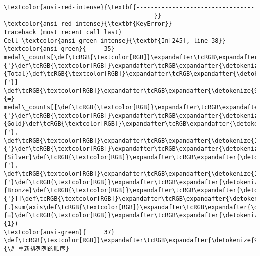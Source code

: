 \documentclass[11pt]{article}
\begin{document}
    \begin{Verbatim}[commandchars=\\\{\}, frame=single, framerule=2mm, rulecolor=\color{outerrorbackground}]
\textcolor{ansi-red-intense}{\textbf{---------------------------------------------------------------------------}}
\textcolor{ansi-red-intense}{\textbf{KeyError}}                                  Traceback (most recent call last)
Cell \textcolor{ansi-green-intense}{\textbf{In[245], line 38}}
\textcolor{ansi-green}{     35} medal\_counts[\def\tcRGB{\textcolor[RGB]}\expandafter\tcRGB\expandafter{\detokenize{175,0,0}}{'}\def\tcRGB{\textcolor[RGB]}\expandafter\tcRGB\expandafter{\detokenize{175,0,0}}{Total}\def\tcRGB{\textcolor[RGB]}\expandafter\tcRGB\expandafter{\detokenize{175,0,0}}{'}] \def\tcRGB{\textcolor[RGB]}\expandafter\tcRGB\expandafter{\detokenize{98,98,98}}{=} medal\_counts[[\def\tcRGB{\textcolor[RGB]}\expandafter\tcRGB\expandafter{\detokenize{175,0,0}}{'}\def\tcRGB{\textcolor[RGB]}\expandafter\tcRGB\expandafter{\detokenize{175,0,0}}{Gold}\def\tcRGB{\textcolor[RGB]}\expandafter\tcRGB\expandafter{\detokenize{175,0,0}}{'}, \def\tcRGB{\textcolor[RGB]}\expandafter\tcRGB\expandafter{\detokenize{175,0,0}}{'}\def\tcRGB{\textcolor[RGB]}\expandafter\tcRGB\expandafter{\detokenize{175,0,0}}{Silver}\def\tcRGB{\textcolor[RGB]}\expandafter\tcRGB\expandafter{\detokenize{175,0,0}}{'}, \def\tcRGB{\textcolor[RGB]}\expandafter\tcRGB\expandafter{\detokenize{175,0,0}}{'}\def\tcRGB{\textcolor[RGB]}\expandafter\tcRGB\expandafter{\detokenize{175,0,0}}{Bronze}\def\tcRGB{\textcolor[RGB]}\expandafter\tcRGB\expandafter{\detokenize{175,0,0}}{'}]]\def\tcRGB{\textcolor[RGB]}\expandafter\tcRGB\expandafter{\detokenize{98,98,98}}{.}sum(axis\def\tcRGB{\textcolor[RGB]}\expandafter\tcRGB\expandafter{\detokenize{98,98,98}}{=}\def\tcRGB{\textcolor[RGB]}\expandafter\tcRGB\expandafter{\detokenize{98,98,98}}{1})
\textcolor{ansi-green}{     37} \def\tcRGB{\textcolor[RGB]}\expandafter\tcRGB\expandafter{\detokenize{95,135,135}}{\# 重新排列列的顺序}

\end{Verbatim}
\end{document}
